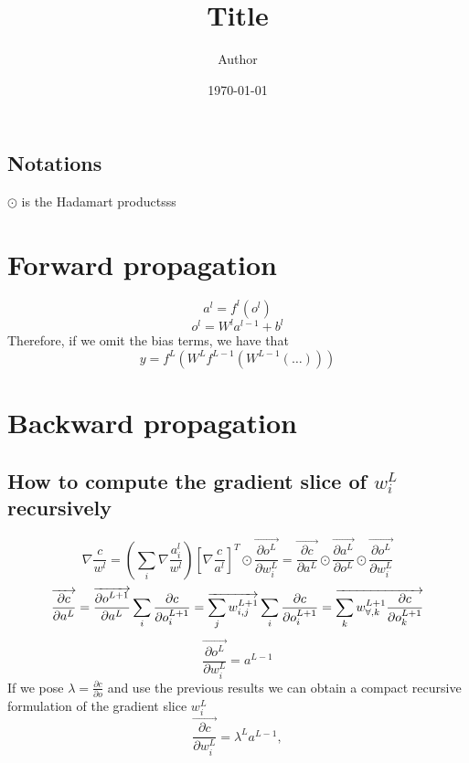 \documentclass[11pt]{article}
\title{ Title}
\author{ Author }
\date{\today}
\begin{document}
\subsection{Notations}
$\odot$ is the Hadamart productsss

\section{Forward propagation}

\[a^{l} = f^{l}(o^{l})\]
\[o^{l} = W^{l}a^{l-1}+b^{l}\]
Therefore, if we omit the bias terms, we have that
\[
y=
f^L(W^L
	f^{L-1}(W^{L-1}(
		\dots
	))
)
\]



\section{Backward propagation}
\subsection{How to compute the gradient slice of $w_{i}^L$ recursively}
\[
\nabla {\frac{c}{ w^l}} 
= 
(\sum_{i} \nabla \frac{a^{l}_{i}}{ w^l} )
[\nabla \frac{c}{a^l}]^T
\odot
\overrightarrow{\frac{\partial o^L}{\partial w_{i}^L}}
=
\overrightarrow{\frac{\partial c}{\partial a^L}}
\odot
\overrightarrow{\frac{\partial a^L}{\partial o^L}}
\odot
\overrightarrow{\frac{\partial o^L}{\partial w_{i}^L}}
\]
\[
\overrightarrow{\frac{\partial c}{\partial a^L}}
=
\overrightarrow{\frac{\partial o^{L+1}}{\partial a^L}}
\sum_{i} \frac{\partial c}{\partial o^{L+1}_{i}} 
=
\overrightarrow{\sum_{j} w_{i, j}^{L+1}}
\sum_{i} \frac{\partial c}{\partial o^{L+1}_{i}}
=
\overrightarrow{\sum_{k} w_{\forall, k}^{L+1} 
\frac{\partial c}{\partial o^{L+1}_{k}}}\\
\]
\[
\overrightarrow{\frac{\partial o^L}{\partial w_{i}^L}} = a^{L-1}
\]
If we pose $\lambda = \frac{\partial c}{\partial o}$ and use the previous
results we can obtain a compact recursive formulation of the gradient
slice $w_{i}^L$
\[
\overrightarrow{\frac{\partial c}{\partial w_{i}^L}} 
= 
\lambda^{L}a^{L-1}, 
\]
\end{document}
